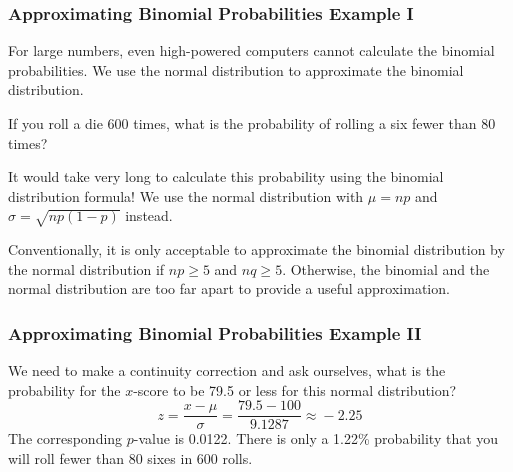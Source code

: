 \documentclass[xcolor=dvipsnames]{beamer}
\begin{document}
\begin{frame}
  \frametitle{Approximating Binomial Probabilities Example I}
  For large numbers, even high-powered computers cannot calculate the
  binomial probabilities. We use the normal distribution to
  approximate the binomial distribution. 

\bigskip

   If you roll a die 600 times, what is the
  probability of rolling a six fewer than 80 times? 

\bigskip

  It would take very long to calculate this probability using the
  binomial distribution formula! We use the normal distribution with
  $\mu=np$ and $\sigma=\sqrt{np(1-p)}$ instead. 

\bigskip

  Conventionally, it is only acceptable to approximate the binomial
  distribution by the normal distribution if $np\geq{}5$ and
  $nq\geq{}5$. Otherwise, the binomial and the normal distribution are
  too far apart to provide a useful approximation.
\end{frame}

\begin{frame}
  \frametitle{Approximating Binomial Probabilities Example II}
  We need to make a \alert{continuity correction} and ask ourselves,
  what is the probability for the $x$-score to be 79.5 or less for
  this normal distribution?
  \begin{equation}
    \label{eq:oolojuth}
    z=\frac{x-\mu}{\sigma}=\frac{79.5-100}{9.1287}\approx{}-2.25
  \end{equation}
  The corresponding $p$-value is 0.0122. There is only a 1.22\%
  probability that you will roll fewer than 80 sixes in 600 rolls.
\end{frame}
\end{document}

